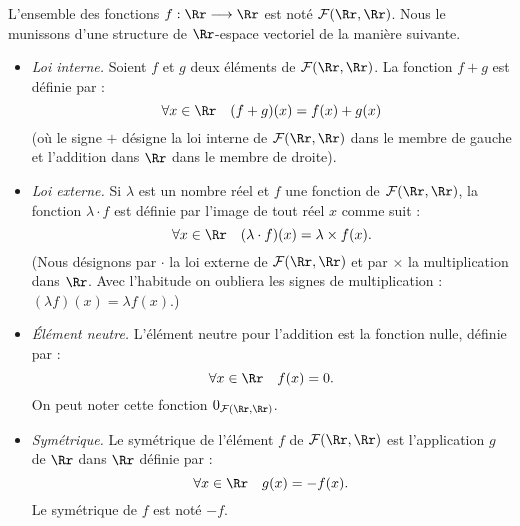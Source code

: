 \documentclass[class=report,crop=false]{standalone}
\begin{document}
\begin{exemple}
\label{ex:evfonct}
L'ensemble des fonctions $f : \Rr \longrightarrow \Rr$ est noté $\mathcal{F}(\Rr, \Rr)$.
Nous le munissons d'une structure de $\Rr$-espace vectoriel de la manière  suivante.

\begin{itemize}
  \item \emph{Loi interne.}
Soient $f$ et $g$ deux éléments de $\mathcal{F}(\Rr, \Rr)$. La fonction $f+g$ est définie par  :
$$\forall x \in \Rr \quad (f+g)(x)=f(x)+g(x)$$
(où le signe $+$ désigne la loi interne de $\mathcal{F}(\Rr , \Rr)$ dans le membre de gauche
et l'addition dans $\Rr$ dans le membre de droite).

  \item \emph{Loi externe.}
Si $\lambda$ est un nombre réel et $f$ une fonction de $\mathcal{F}(\Rr, \Rr)$, la fonction
$\lambda \cdot f$ est définie par l'image de tout réel $x$ comme suit :
$$\forall x \in \Rr \quad (\lambda \cdot f) (x)=\lambda \times f (x).$$
(Nous désignons par $\cdot$ la loi externe de $\mathcal{F}(\Rr, \Rr)$ et par $\times $ la multiplication dans
$\Rr$. Avec l'habitude on oubliera les signes de multiplication : $(\lambda f) (x)=\lambda f (x)$.)


  \item \emph{\'Elément neutre.}
  L'élément neutre pour l'addition est la fonction nulle, définie par :
$$\forall x \in \Rr \quad f(x)=0.$$
On peut noter cette fonction $0_{\mathcal{F}(\Rr, \Rr)}$.

  \item \emph{Symétrique.}
Le symétrique de l'élément $f$ de $\mathcal{F}(\Rr , \Rr)$ est l'application $g$ de $\Rr$ dans $\Rr$ définie par :
$$\forall x \in \Rr \quad g(x)=-f(x).$$
Le symétrique de $f$ est noté $-f$.
\end{itemize}

\end{exemple}
\end{document}
